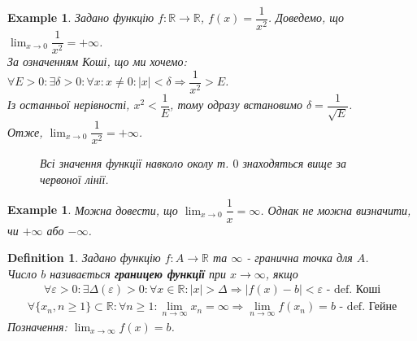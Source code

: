 \documentclass[a4paper, 14pt]{article}
\theoremstyle{theoremdd}
\theoremstyle{theoremdd}
\newtheorem{definition}[theorem]{Definition}
\theoremstyle{theoremdd}
\theoremstyle{theoremdd}
\newtheorem{example}[theorem]{Example}
\theoremstyle{theoremdd}
\theoremstyle{theoremdd}
\theoremstyle{theoremdd}
\theoremstyle{theoremdd}
\begin{document}
	\begin{example}
	Задано функцію $f: \mathbb{R} \to \mathbb{R}$, $f(x) = \dfrac{1}{x^2}$. Доведемо, що $\displaystyle\lim_{x \to 0} \dfrac{1}{x^2} = +\infty$.\\
	За означенням Коші, що ми хочемо:\\
	$\forall E > 0: \exists \delta > 0: \forall x: x \neq 0: |x|<\delta \Rightarrow \dfrac{1}{x^2} > E$.\\
	Із останньої нерівності, $x^2 < \dfrac{1}{E}$, тому одразу встановимо $\delta = \dfrac{1}{\sqrt{E}}$.\\
	Отже, $\displaystyle\lim_{x \to 0} \dfrac{1}{x^2} = +\infty$.
\begin{figure} [H]
\centering
{}
\caption*{Всі значення функції навколо околу т. $0$ знаходяться вище за червоної лінії.}
\end{figure}
	\end{example}
	
	\begin{example}
	Можна довести, що $\displaystyle\lim_{x \to 0} \dfrac{1}{x} = \infty$. Однак не можна визначити, чи $+\infty$ або $-\infty$.
	\end{example}
	
	\begin{definition}
	Задано функцію $f: A \to \mathbb{R}$ та $\infty$ - гранична точка для $A$.\\
	Число $b$ називається \textbf{границею функції} при $x \to \infty$, якщо
	\begin{align*}
	\forall \varepsilon > 0: \exists \Delta(\varepsilon) > 0: \forall x \in \mathbb{R}: |x|>\Delta \Rightarrow |f(x)-b|<\varepsilon \textrm{ - def. Коші}
	\end{align*}
	\begin{align*}
	\forall \{x_n, n \geq 1\} \subset \mathbb{R}: \forall n \geq 1: \lim_{n \to \infty} x_n = \infty \Rightarrow \lim_{n \to \infty} f(x_n) = b \textrm{ - def. Гейне}
	\end{align*}
	Позначення: $\displaystyle \lim_{x \to \infty} f(x) = b$.
	\end{definition}
	
\end{document}
